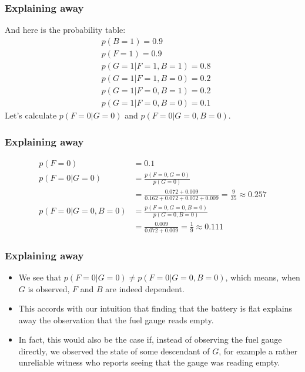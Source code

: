 \documentclass{beamer}
\begin{document}
\begin{frame}
    \frametitle{Explaining away}
    And here is the probability table:
    \begin{align*}
        &p(B=1)=0.9 \\
        &p(F=1)=0.9 \\
        &p(G=1|F=1,B=1)=0.8 \\
        &p(G=1|F=1,B=0)=0.2 \\
        &p(G=1|F=0,B=1)=0.2 \\
        &p(G=1|F=0,B=0)=0.1
    \end{align*}
    Let's calculate $p(F=0|G=0)$ and $p(F=0|G=0,B=0)$.
\end{frame}

\begin{frame}
    \frametitle{Explaining away}
    \begin{align*}
        p(F=0)&=0.1 \\
        p(F=0|G=0)&=\frac{p(F=0,G=0)}{p(G=0)} \\
        &=\frac{0.072+0.009}{0.162+0.072+0.072+0.009}=\frac{9}{35}\approx{}0.257 \\
        p(F=0|G=0,B=0)&=\frac{p(F=0,G=0,B=0)}{p(G=0,B=0)} \\
        &=\frac{0.009}{0.072+0.009}=\frac{1}{9}\approx{}0.111
    \end{align*}
\end{frame}

\begin{frame}
    \frametitle{Explaining away}
    \begin{itemize}
        \item We see that $p(F=0|G=0)\ne{}p(F=0|G=0,B=0)$, which means, when $G$ is observed, $F$ and $B$ are indeed dependent.
        \item This accords with our intuition that finding that the battery is flat explains away the observation that the fuel gauge reads empty.
        \item In fact, this would also be the case if, instead of observing the fuel gauge directly, we observed the state of some descendant of $G$, for example a rather unreliable witness who reports seeing that the gauge was reading empty.
    \end{itemize}
\end{frame}
\end{document}
